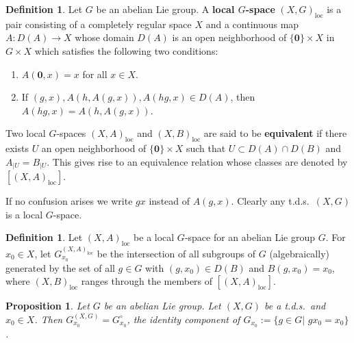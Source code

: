 \documentclass[11pt]{article}
\theoremstyle{plain}
\newtheorem{prop}[thm]{Proposition}
\theoremstyle{definition}
\newtheorem{defn}[thm]{Definition}
\numberwithin{figure}{section}
\begin{document}
\begin{defn}\cite[Appendix II, Definition 1.1]{HM66}\label{local space}
    Let $G$ be an abelian Lie group. A \textbf{local $G$-space} $(X,G)_{\textrm{loc}}$ is a pair consisting of a completely regular space $X$ and a continuous map $A:D(A)\to X$ whose domain $D(A)$ is an open neighborhood of
     $\{\mathbf{0}\} \times X $ in $ G \times X$
    which satisfies the following two conditions:
    \begin{enumerate}[$(a)$]
    
\item $A(\mathbf{0},x)=x$ for all $x\in X$.
    
    \item If $(g,x),A(h,A(g,x)),A(hg,x)\in D(A)$, then $A(hg,x)=A(h,A(g,x))$.
        \end{enumerate}

Two local $G$-spaces $(X,A)_{\textrm{loc}}$ and $(X,B)_{\textrm{loc}}$ are said to be \textbf{equivalent} if there exists $U$ an open neighborhood of $\{\mathbf{0}\} \times X$ such that $U\subset D(A)\cap D(B)$ and $A_{|U}=B_{|U}$. This gives rise to an equivalence relation whose classes are denoted by $[(X,A)_{\textrm{loc}}]$. 
 \end{defn}
If no confusion arises we write $gx$ instead of $A(g,x)$. Clearly any t.d.s.\ $(X,G)$ is a local $G$-space. 

\begin{defn}\cite[Appendix II, Definition 1.9]{HM66}\label{def:isotropy_group}
    Let $(X,A)_{\textrm{loc}}$ be a local $G$-space for an abelian Lie group $G$. For $x_0\in X$, let $G_{x_0}^{(X,A)_{\textrm{loc}}}$ be the intersection of all subgroups of $G$ (algebraically) generated by the set of all $g\in G$ with $(g,x_0)\in D(B)$ and $B(g,x_0)=x_0$, where $(X,B)_{\textrm{loc}}$ ranges through the members of $[(X,A)_{\textrm{loc}}]$. 
\end{defn}

\begin{prop}
    Let $G$ be an abelian Lie group. Let $(X,G)$ be a t.d.s.\ and  $x_0\in X$. Then $G_{x_0}^{(X,G)}=G_{x_0}^\circ$, the identity component of $G_{x_0}:=\{g\in G|\,\, gx_0=x_0\}$. 
\end{prop}
\end{document}
